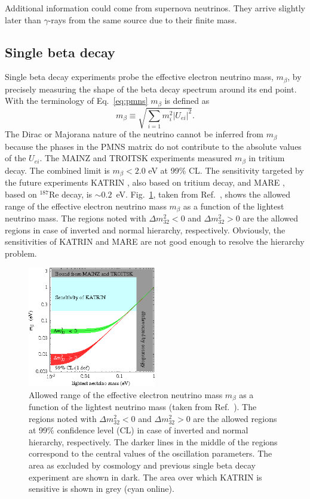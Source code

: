 Additional information could come from supernova neutrinos.
They arrive slightly later than $\gamma$-rays from the same
source due to their finite mass.

\subsection{Single beta decay}
\label{sec:sbd}
Single beta decay experiments probe the effective electron neutrino mass, $m_{\beta}$, by precisely measuring the shape of the beta decay spectrum around its end point. With the terminology of Eq.~\ref{eq:pmns} $m_{\beta}$ is defined as
\begin{equation}
  \label{eq:m1b}
  m_{\beta} \equiv \sqrt{\sum_{i=1}m_{i}^{2}|U_{ei}|^{2}}.
\end{equation}
The Dirac or Majorana nature of the neutrino cannot be inferred from $m_{\beta}$ because the phases in the PMNS matrix do not contribute to the absolute values of the $U_{ei}$. The MAINZ \cite{Mai99} and TROITSK \cite{Tro99} experiments measured $m_{\beta}$ in tritium decay. The combined limit is $m_{\beta} < 2.0$ eV at 99\% CL. The sensitivity targeted by the future experiments KATRIN \cite{Kat01}, also based on tritium decay, and MARE \cite{Mar05}, based on $^{187}$Re decay, is $\sim 0.2$~eV. Fig.~\ref{fig:m1bVSlightest}, taken from Ref.~\cite{Str05}, shows the allowed range of the effective electron neutrino mass $m_{\beta}$ as a function of the lightest neutrino mass. The regions noted with $\Delta m^{2}_{32}<0$ and $\Delta m^{2}_{32}>0$ are the allowed regions in case of inverted and normal hierarchy, respectively. Obviously, the sensitivities of KATRIN and MARE are not good enough to resolve the hierarchy problem.
\begin{figure}[tbhp]
\centering
\includegraphics[width=0.5\textwidth]{m1bVSlightest}  
\caption{Allowed range of the effective electron neutrino mass $m_{\beta}$ as a function of the lightest neutrino mass (taken from Ref.~\cite{Str05}). The regions noted with $\Delta m^{2}_{32}<0$ and $\Delta m^{2}_{32}>0$ are the allowed regions at 99\% confidence level (CL) in case of inverted and normal hierarchy, respectively. The
darker lines in the middle of the regions correspond to the central values of the oscillation parameters. The area as excluded by cosmology and previous single beta decay experiment are shown in dark. The area over which KATRIN is sensitive is shown in grey (cyan online).}
\label{fig:m1bVSlightest}
\end{figure}

